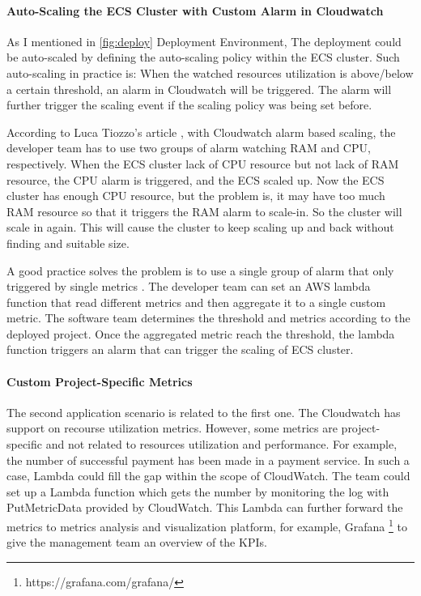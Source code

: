 \paragraph[]{Auto-Scaling the ECS Cluster with Custom Alarm in Cloudwatch}
As I mentioned in \ref{fig:deploy} Deployment Environment, The deployment could be auto-scaled by defining the auto-scaling policy within the ECS cluster. Such auto-scaling in practice is: When the watched resources utilization is above/below a certain threshold, an alarm in Cloudwatch will be triggered. The alarm will further trigger the scaling event if the scaling policy was being set before.
\par
According to Luca Tiozzo's article \cite{AWSECSho47:online}, with Cloudwatch alarm based scaling, the developer team has to use two groups of alarm watching RAM and CPU, respectively. When the ECS cluster lack of CPU resource but not lack of RAM resource, the CPU alarm is triggered, and the ECS scaled up. Now the ECS cluster has enough CPU resource, but the problem is, it may have too much RAM resource so that it triggers the RAM alarm to scale-in. So the cluster will scale in again. This will cause the cluster to keep scaling up and back without finding and suitable size.
\par
A good practice solves the problem is to use a single group of alarm that only triggered by single metrics \cite{AWSECSho47:online}. The developer team can set an AWS lambda function that read different metrics and then aggregate it to a single custom metric. The software team determines the threshold and metrics according to the deployed project. Once the aggregated metric reach the threshold, the lambda function triggers an alarm that can trigger the scaling of ECS cluster. 
\paragraph[]{Custom Project-Specific Metrics}
The second application scenario is related to the first one. The Cloudwatch has support on recourse utilization metrics. However, some metrics are project-specific and not related to resources utilization and performance. For example, the number of successful payment has been made in a payment service. In such a case, Lambda could fill the gap within the scope of CloudWatch. The team could set up a Lambda function which gets the number by monitoring the log with PutMetricData provided by CloudWatch. This Lambda can further forward the metrics to metrics analysis and visualization platform, for example, Grafana \footnote{https://grafana.com/grafana/} to give the management team an overview of the KPIs.
